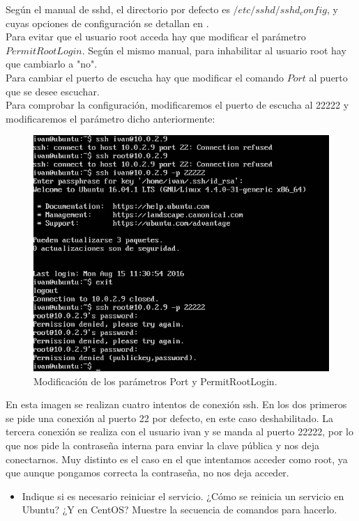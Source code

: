 Según el manual de sshd\cite{sshd}, el directorio por defecto es $/etc/sshd/sshd_config$, y cuyas opciones de configuración se detallan en \cite{sshd_config}.\\

Para evitar que el usuario root acceda hay que modificar el parámetro $PermitRootLogin$. Según el mismo manual, para inhabilitar al usuario root hay que cambiarlo a "no".\\
	
Para cambiar el puerto de escucha hay que modificar el comando $Port$ al puerto que se desee escuchar.\\
	
Para comprobar la configuración, modificaremos el puerto de escucha al 22222 y modificaremos el parámetro dicho anteriormente:\\
	
\begin{figure}[H]
	\centering
	\includegraphics[width=0.7\linewidth]{conexion_puerto_22222}
	\caption[Conexión al puerto 22222]{Modificación de los parámetros Port y PermitRootLogin.}
	\label{fig:conexion_puerto_22222}
\end{figure}
	
En esta imagen se realizan cuatro intentos de conexión ssh. En los dos primeros se pide una conexión al puerto 22 por defecto, en este caso deshabilitado. La tercera conexión se realiza con el usuario ivan y se manda al puerto 22222, por lo que nos pide la contraseña interna para enviar la clave pública y nos deja conectarnos. Muy distinto es el caso en el que intentamos acceder como root, ya que aunque pongamos correcta la contraseña, no nos deja acceder.
\begin{itemize}
	\item Indique si es necesario reiniciar el servicio. ¿Cómo se reinicia un servicio en Ubuntu? ¿Y en CentOS? Muestre la secuencia de comandos para hacerlo.\\
\end{itemize}
	
